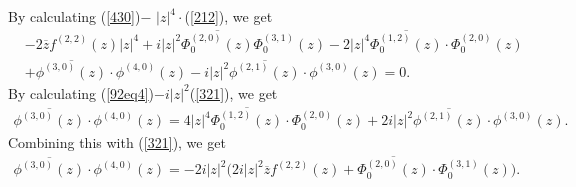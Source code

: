 \documentclass[12pt]{article}
\numberwithin{equation}{section}
\def\ov{\overline}
\begin{document}
By calculating (\ref{430})$-$ $|z|^4\cdot$(\ref{212}), we get
\begin{equation}\begin{split}\label{92eq4}
&-2\ov{z}f^{(2,2)}(z)|z|^4+i|z|^2\ov{\Phi_0^{(2,0)}(z)}\Phi_0^{(3,1)}(z)-2|z|^4\ov{\Phi_0^{(1,2)}(z)}\cdot
\Phi_0^{(2,0)}(z)\\
&+\ov{\phi^{(3,0)}(z)}\cdot
\phi^{(4,0)}(z)-i|z|^2\ov{\phi^{(2,1)}(z)}\cdot \phi^{(3,0)}(z)=0.
\end{split}\end{equation}
By calculating (\ref{92eq4})$-i|z|^2$(\ref{321}), we get
\begin{equation}\begin{split}\label{92eq5}
\ov{\phi^{(3,0)}(z)}\cdot
\phi^{(4,0)}(z)=4|z|^4\ov{\Phi_0^{(1,2)}(z)}\cdot
\Phi_0^{(2,0)}(z)+2i|z|^2\ov{\phi^{(2,1)}(z)}\cdot \phi^{(3,0)}(z).
\end{split}\end{equation}
Combining this with (\ref{321}), we get
\begin{equation}\begin{split}\label{92eq05}
\ov{\phi^{(3,0)}(z)}\cdot
\phi^{(4,0)}(z)=-2i|z|^2\Big(2i|z|^2\ov{z}f^{(2,2)}(z)+\ov{\Phi_0^{(2,0)}(z)}\cdot\Phi_0^{(3,1)}(z)\Big).
\end{split}\end{equation}
\end{document}
